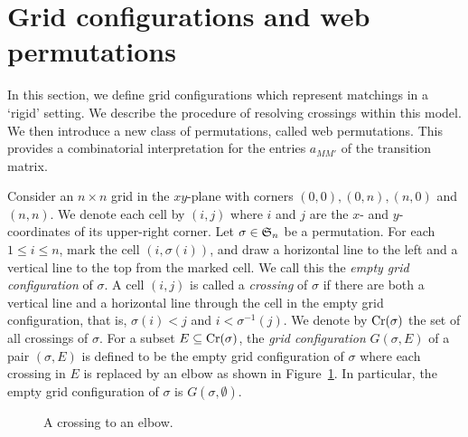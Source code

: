 
\section{Grid configurations and web permutations}
\label{sec:grid configuration}
In this section, we define grid configurations which represent matchings
in a `rigid' setting.
We describe the procedure of resolving crossings within this model.
We then introduce a new class of permutations, called web permutations.
This provides a combinatorial interpretation for the entries \( a_{MM'} \) of the transition
matrix.

Consider an $n \times n$ grid in the $xy$-plane with corners
$(0,0), (0,n), (n,0)$ and $(n,n)$.
We denote each cell by $(i,j)$ where $i$ and $j$ are the $x$- and $y$-coordinates of its upper-right corner.
Let $\sigma\in\mathfrak{S}_n$ be a permutation. For each $1\le i\le n$, mark the cell \( (i,\sigma(i)) \),
and draw a horizontal line to the left and a vertical line to the top from the marked cell.
We call this the \emph{empty grid configuration} of \( \sigma \).
A cell $(i,j)$ is called a \emph{crossing} of \( \sigma \) if
there are both a vertical line and a horizontal line through the cell
in the empty grid configuration, that is,
\( \sigma(i) < j \) and \( i < \sigma^{-1}(j) \).
We denote by \( \operatorname{Cr}(\sigma) \) the set of all crossings of \( \sigma \).
For a subset \( E\subseteq\operatorname{Cr}(\sigma) \),
the \emph{grid configuration} \( G(\sigma,E) \) of a pair \( (\sigma, E) \)
is defined to be the empty grid configuration of \( \sigma \)
where each crossing in \( E \)
is replaced by an elbow as shown in Figure~\ref{fig:A crossing to an elbow}.
In particular, the empty grid
configuration of \( \sigma \) is \( G(\sigma,\emptyset) \).
\begin{figure}
  \centering
  \caption{A crossing to an elbow.}
  \label{fig:A crossing to an elbow}
\end{figure}

